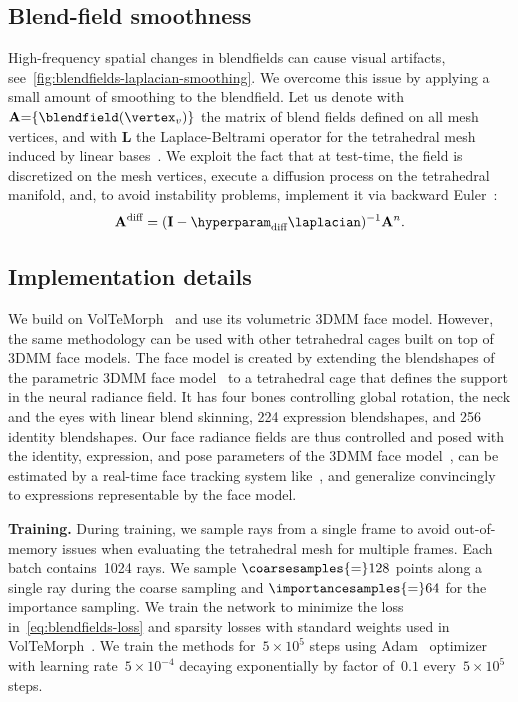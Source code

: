   \subsection{Blend-field smoothness}
    \label{sec:blendfields-smoothness}
    \newcommand{\blendfieldVertices}{\mathbf{A}}
    High-frequency spatial changes in blendfields can cause visual artifacts,
    see~\cref{fig:blendfields-laplacian-smoothing}.
    We overcome this issue by applying a small amount of smoothing to the
    blendfield.
    Let us denote with $\blendfieldVertices{=}\{\blendfield(\vertex_v)\}$ the
    matrix of blend fields defined on all mesh vertices, and with $\mathbf{L}$ the
    Laplace-Beltrami operator for the tetrahedral mesh induced by linear
    bases~\cite{irving2004invertible}.
    We exploit the fact that at test-time, the field is discretized on the mesh vertices, execute a diffusion process on the tetrahedral manifold, and, to avoid instability problems, implement it via backward Euler~\cite{desbrun1999implicit}:
    \begin{equation}
      \blendfieldVertices^\text{diff} = (\mathbf{I} - \hyperparam_\text{diff} \laplacian)^{-1} \blendfieldVertices^n.
    \end{equation}

  \subsection{Implementation details}
    \label{sec:blendfields-implementation}
    We build on VolTeMorph~\cite{garbin2024voltemorph} and use its volumetric 3DMM
    face model.
    However, the same methodology can be used with other tetrahedral cages built
    on top of 3DMM face models.
    The face model is created by extending the blendshapes of the parametric 3DMM
    face model~\cite{wood2021fake} to a tetrahedral cage that defines the support
    in the neural radiance field.
    It has four bones controlling global rotation, the neck and the eyes with
    linear blend skinning, 224 expression blendshapes, and 256 identity
    blendshapes.
    Our face radiance fields are thus controlled and posed with the identity,
    expression, and pose parameters of the 3DMM face model~\cite{wood2021fake},
    can be estimated by a real-time face tracking system like~\cite{wood20223d},
    and generalize convincingly to expressions representable by the face model.

    \noindent\textbf{Training.}
    During training, we sample rays from a single frame to avoid out-of-memory
    issues when evaluating the tetrahedral mesh for multiple frames.
    Each batch contains~1024 rays.
    We sample $\coarsesamples{=}128$ points along a single ray during the coarse
    sampling and $\importancesamples{=}64$ for the importance sampling.
    We train the network to minimize the loss in~\cref{eq:blendfields-loss} and
    sparsity losses with standard weights used in
    VolTeMorph~\cite{garbin2024voltemorph,hedman2021baking}.
    We train the methods for~$5{\times}10^5$ steps using
    Adam~\cite{kingma2014adam} optimizer with learning rate~$5{\times}10^{-4}$
    decaying exponentially by factor of~$0.1$ every~$5{\times}10^5$ steps.

